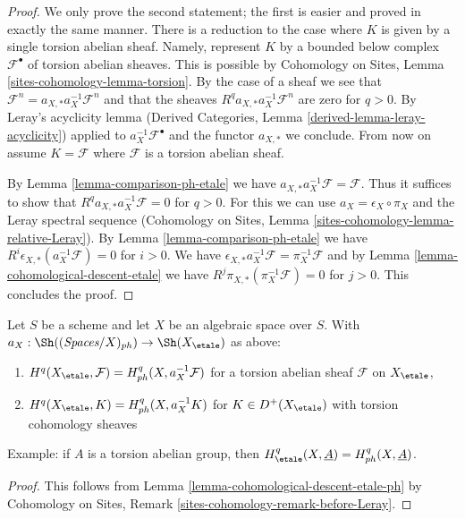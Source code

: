 \begin{proof}
We only prove the second statement; the first is easier and proved in exactly
the same manner. There is a reduction to the case where
$K$ is given by a single torsion abelian sheaf. Namely, represent $K$
by a bounded below complex $\mathcal{F}^\bullet$ of torsion
abelian sheaves. This is possible by Cohomology on Sites, Lemma
\ref{sites-cohomology-lemma-torsion}.
By the case of a sheaf we see that
$\mathcal{F}^n = a_{X, *} a_X^{-1} \mathcal{F}^n$
and that the sheaves $R^qa_{X, *}a_X^{-1}\mathcal{F}^n$
are zero for $q > 0$. By Leray's acyclicity lemma
(Derived Categories, Lemma \ref{derived-lemma-leray-acyclicity})
applied to $a_X^{-1}\mathcal{F}^\bullet$
and the functor $a_{X, *}$ we conclude. From now on assume
$K = \mathcal{F}$ where $\mathcal{F}$ is a torsion abelian sheaf.

\medskip\noindent
By Lemma \ref{lemma-comparison-ph-etale} we have
$a_{X, *}a_X^{-1}\mathcal{F} = \mathcal{F}$. Thus it suffices to show that
$R^qa_{X, *}a_X^{-1}\mathcal{F} = 0$ for $q > 0$.
For this we can use $a_X = \epsilon_X \circ \pi_X$ and
the Leray spectral sequence
(Cohomology on Sites, Lemma \ref{sites-cohomology-lemma-relative-Leray}).
By Lemma \ref{lemma-comparison-ph-etale}
we have $R^i\epsilon_{X, *}(a_X^{-1}\mathcal{F}) = 0$ for $i > 0$.
We have
$\epsilon_{X, *}a_X^{-1}\mathcal{F} = \pi_X^{-1}\mathcal{F}$
and by Lemma \ref{lemma-cohomological-descent-etale} we have
$R^j\pi_{X, *}(\pi_X^{-1}\mathcal{F}) = 0$ for $j > 0$.
This concludes the proof.
\end{proof}

\begin{lemma}
\label{lemma-compare-cohomology-etale-ph}
Let $S$ be a scheme and let $X$ be an algebraic space over $S$.
With $a_X : \Sh((\textit{Spaces}/X)_{ph}) \to \Sh(X_\etale)$
as above:
\begin{enumerate}
\item $H^q(X_\etale, \mathcal{F}) = H^q_{ph}(X, a_X^{-1}\mathcal{F})$
for a torsion abelian sheaf $\mathcal{F}$ on $X_\etale$,
\item $H^q(X_\etale, K) = H^q_{ph}(X, a_X^{-1}K)$ for $K \in D^+(X_\etale)$
with torsion cohomology sheaves
\end{enumerate}
Example: if $A$ is a torsion abelian group, then
$H^q_\etale(X, \underline{A}) = H^q_{ph}(X, \underline{A})$.
\end{lemma}

\begin{proof}
This follows from Lemma \ref{lemma-cohomological-descent-etale-ph}
by Cohomology on Sites, Remark \ref{sites-cohomology-remark-before-Leray}.
\end{proof}

